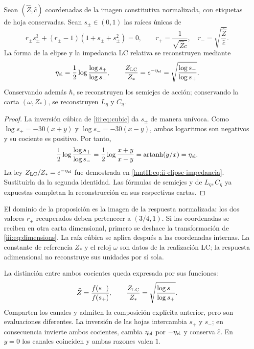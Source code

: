 \begin{proposition}
\label{iii:prop:radion-puente}
Sean $(\widehat Z,\widehat c)$ coordenadas de la imagen constitutiva
normalizada, con etiquetas de hoja conservadas. Sean $s_\pm\in(0,1)$
las raíces únicas de
\begin{equation}
 r_\pm s_\pm^3+(r_\pm-1)(1+s_\pm+s_\pm^2)=0,\qquad
 r_+=\frac1{\sqrt{\widehat Z\widehat c}},\quad
 r_-=\sqrt{\frac{\widehat Z}{\widehat c}}.
 \label{iii:eq:radion-inversa}
\end{equation}
La forma de la elipse y la impedancia LC relativa se reconstruyen mediante
\begin{equation}
 \eta_{\rm el}=\frac12\log\frac{\log s_+}{\log s_-},\qquad
 \frac{Z_{\rm LC}}{Z_*}
   =e^{-\eta_{\rm el}}
   =\sqrt{\frac{\log s_-}{\log s_+}}.
 \label{iii:eq:radion-puente-LC}
\end{equation}
Conservando además $\hbar$, se reconstruyen los semiejes de acción;
conservando la carta $(\omega,Z_*)$, se reconstruyen $L_\eta$ y $C_\eta$.
\end{proposition}
\begin{proof}
La inversión cúbica de \eqref{iii:eq:cubic} da $s_\pm$ de manera
unívoca. Como $\log s_+=-30(x+y)$ y $\log s_-=-30(x-y)$, ambos logaritmos
son negativos y su cociente es positivo. Por tanto,
\[
 \frac12\log\frac{\log s_+}{\log s_-}
  =\frac12\log\frac{x+y}{x-y}
  =\operatorname{artanh}(y/x)=\eta_{\rm el}.
\]
La ley $Z_{\rm LC}/Z_*=e^{-\eta_{\rm el}}$ fue demostrada en
\eqref{hmtII:eq:ii-elipse-impedancia}. Sustituirla da la segunda
identidad. Las fórmulas de semiejes y de $L_\eta,C_\eta$ ya expuestas
completan la reconstrucción en sus respectivas cartas.
\end{proof}

El dominio de la proposición es la imagen de la respuesta normalizada:
los dos valores $r_\pm$ recuperados deben pertenecer a $(3/4,1)$.
Si las coordenadas se reciben en otra carta dimensional, primero se
deshace la transformación de \eqref{iii:eq:dimensions}. La raíz cúbica
se aplica después a las coordenadas internas. La constante de referencia
$Z_*$ y el reloj $\omega$ son datos de la realización LC; la respuesta
adimensional no reconstruye sus unidades por sí sola.

La distinción entre ambos cocientes queda expresada por sus funciones:
\begin{equation}
 \widehat Z=\frac{f(s_-)}{f(s_+)},\qquad
 \frac{Z_{\rm LC}}{Z_*}
       =\sqrt{\frac{\log s_-}{\log s_+}}.
 \label{iii:eq:radion-dos-impedancias}
\end{equation}
Comparten los canales y admiten la composición explícita anterior, pero
son evaluaciones diferentes. La inversión de las hojas intercambia
$s_+$ y $s_-$; en consecuencia invierte ambos cocientes, cambia
$\eta_{\rm el}$ por $-\eta_{\rm el}$ y conserva $\widehat c$.
En $y=0$ los canales coinciden y ambas razones valen $1$.

